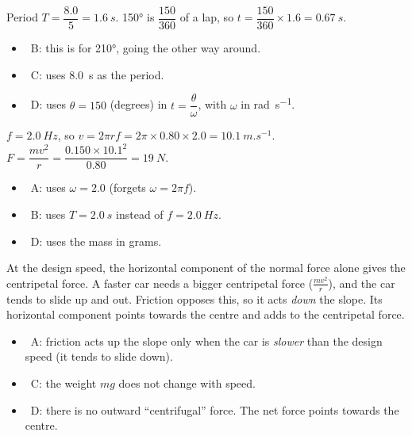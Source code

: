 \documentclass[12pt]{article}
\begin{document}
\begin{practiceanswers}
\begin{practiceans}
  Period $T = \dfrac{8.0}{5} = \qty{1.6}{s}$. \ang{150} is $\dfrac{150}{360}$ of a lap, so
  $t = \dfrac{150}{360} \times 1.6 = \qty{0.67}{s}$.
  \begin{itemize}
    \item \xmark\ B: this is for \ang{210}, going the other way around.
    \item \xmark\ C: uses \qty{8.0}{s} as the period.
    \item \xmark\ D: uses $\theta = 150$ (degrees) in $t = \dfrac{\theta}{\omega}$, with $\omega$ in
          \si{rad.s^{-1}}.
  \end{itemize}
\end{practiceans}

\begin{practiceans}
  $f = \qty{2.0}{Hz}$, so $v = 2\pi rf = 2\pi \times 0.80 \times 2.0 = \qty{10.1}{m.s^{-1}}$.
  $F = \dfrac{mv^2}{r} = \dfrac{0.150 \times 10.1^2}{0.80} = \qty{19}{N}$.
  \begin{itemize}
    \item \xmark\ A: uses $\omega = 2.0$ (forgets $\omega = 2\pi f$).
    \item \xmark\ B: uses $T = \qty{2.0}{s}$ instead of $f = \qty{2.0}{Hz}$.
    \item \xmark\ D: uses the mass in grams.
  \end{itemize}
\end{practiceans}

\begin{practiceans}
  At the design speed, the horizontal component of the normal force alone gives the centripetal
  force. A faster car needs a bigger centripetal force ($\frac{mv^2}{r}$), and the car tends to slide
  up and out. Friction opposes this, so it acts \emph{down} the slope. Its horizontal component
  points towards the centre and adds to the centripetal force.
  \begin{itemize}
    \item \xmark\ A: friction acts up the slope only when the car is \emph{slower} than the design
          speed (it tends to slide down).
    \item \xmark\ C: the weight $mg$ does not change with speed.
    \item \xmark\ D: there is no outward “centrifugal” force. The net force points towards
          the centre.
  \end{itemize}
\end{practiceans}


\end{practiceanswers}
\end{document}
